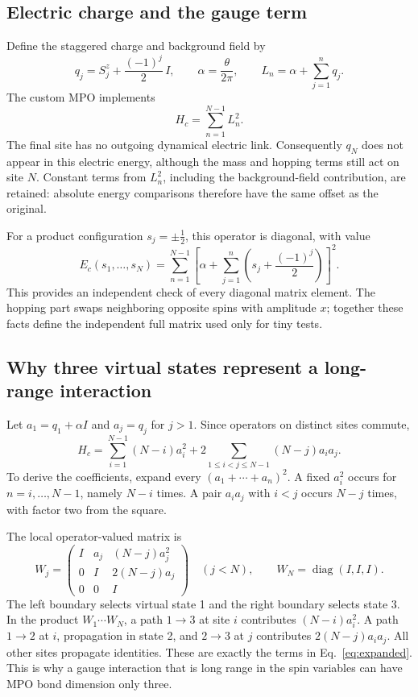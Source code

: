 \documentclass[11pt]{article}
\newcommand{\Sz}{S^z}
\begin{document}
\subsection{Electric charge and the gauge term}
Define the staggered charge and background field by
\begin{equation}
q_j=\Sz_j+\frac{(-1)^j}{2}\,I,\qquad
\alpha=\frac{\theta}{2\pi},\qquad
L_n=\alpha+\sum_{j=1}^n q_j.
\end{equation}
The custom MPO implements
\begin{equation}
H_c=\sum_{n=1}^{N-1}L_n^2.\label{eq:gauge}
\end{equation}
The final site has no outgoing dynamical electric link. Consequently $q_N$ does not appear in this electric energy, although the mass and hopping terms still act on site $N$. Constant terms from $L_n^2$, including the background-field contribution, are retained: absolute energy comparisons therefore have the same offset as the original.

For a product configuration $s_j=\pm\tfrac12$, this operator is diagonal, with value
\begin{equation}
E_c(s_1,\ldots,s_N)=\sum_{n=1}^{N-1}
\left[\alpha+\sum_{j=1}^n\left(s_j+\frac{(-1)^j}{2}\right)\right]^2.
\end{equation}
This provides an independent check of every diagonal matrix element. The hopping part swaps neighboring opposite spins with amplitude $x$; together these facts define the independent full matrix used only for tiny tests.

\subsection{Why three virtual states represent a long-range interaction}
Let $a_1=q_1+\alpha I$ and $a_j=q_j$ for $j>1$. Since operators on distinct sites commute,
\begin{equation}
H_c=\sum_{i=1}^{N-1}(N-i)a_i^2+
2\sum_{1\leq i<j\leq N-1}(N-j)a_i a_j.\label{eq:expanded}
\end{equation}
To derive the coefficients, expand every $(a_1+\cdots+a_n)^2$. A fixed $a_i^2$ occurs for $n=i,\ldots,N-1$, namely $N-i$ times. A pair $a_i a_j$ with $i<j$ occurs $N-j$ times, with factor two from the square.

The local operator-valued matrix is
\begin{equation}
W_j=\begin{pmatrix}
I&a_j&(N-j)a_j^2\\
0&I&2(N-j)a_j\\
0&0&I
\end{pmatrix}\quad (j<N),\qquad W_N=\operatorname{diag}(I,I,I).
\end{equation}
The left boundary selects virtual state 1 and the right boundary selects state 3. In the product $W_1\cdots W_N$, a path $1\to3$ at site $i$ contributes $(N-i)a_i^2$. A path $1\to2$ at $i$, propagation in state 2, and $2\to3$ at $j$ contributes $2(N-j)a_i a_j$. All other sites propagate identities. These are exactly the terms in Eq.~\eqref{eq:expanded}. This is why a gauge interaction that is long range in the spin variables can have MPO bond dimension only three.
\end{document}

